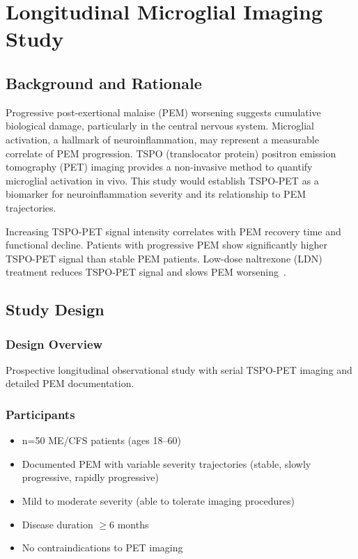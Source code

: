 \section{Longitudinal Microglial Imaging Study}
\label{sec:microglial-imaging-study}

\subsection{Background and Rationale}

Progressive post-exertional malaise (PEM) worsening suggests cumulative biological damage, particularly in the central nervous system. Microglial activation, a hallmark of neuroinflammation, may represent a measurable correlate of PEM progression. TSPO (translocator protein) positron emission tomography (PET) imaging provides a non-invasive method to quantify microglial activation in vivo. This study would establish TSPO-PET as a biomarker for neuroinflammation severity and its relationship to PEM trajectories.

\begin{hypothesis}
\label{hyp:microglial-activation-pem}
Increasing TSPO-PET signal intensity correlates with PEM recovery time and functional decline. Patients with progressive PEM show significantly higher TSPO-PET signal than stable PEM patients. Low-dose naltrexone (LDN) treatment reduces TSPO-PET signal and slows PEM worsening~\cite{Crosby2021LDA}.
\end{hypothesis}

\subsection{Study Design}

\subsubsection{Design Overview}
Prospective longitudinal observational study with serial TSPO-PET imaging and detailed PEM documentation.

\subsubsection{Participants}
\begin{itemize}
    \item n=50 ME/CFS patients (ages 18--60)
    \item Documented PEM with variable severity trajectories (stable, slowly progressive, rapidly progressive)
    \item Mild to moderate severity (able to tolerate imaging procedures)
    \item Disease duration $\geq$6 months
    \item No contraindications to PET imaging
\end{itemize}

